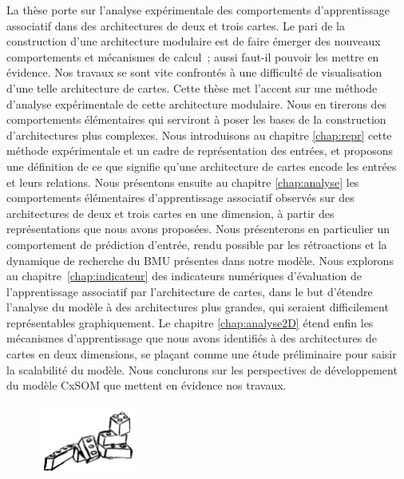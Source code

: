La thèse porte sur l'analyse expérimentale des comportements d'apprentissage associatif dans des architectures de deux et trois cartes. Le pari de la construction d'une architecture modulaire est de faire émerger des nouveaux comportements et mécanismes de calcul~; aussi faut-il pouvoir les mettre en évidence. Nos travaux se sont vite confrontés à une difficulté de visualisation d'une telle architecture de cartes. Cette thèse met l'accent sur une méthode d'analyse expérimentale de cette architecture modulaire. Nous en tirerons des comportements élémentaires qui serviront à poser les bases de la construction d'architectures plus complexes.
Nous introduisons au chapitre \ref{chap:repr} cette méthode expérimentale et un cadre de représentation des entrées, et proposons une définition de ce que signifie qu'une architecture de cartes encode les entrées et leurs relations.
Nous présentons ensuite au chapitre \ref{chap:analyse} les comportements élémentaires d'apprentissage associatif observés sur des architectures de deux et trois cartes en une dimension, à partir des représentations que nous avons proposées. Nous présenterons en particulier un comportement de prédiction d'entrée, rendu possible par les rétroactions et la dynamique de recherche du BMU présentes dans notre modèle.
Nous explorons au chapitre~\ref{chap:indicateur} des indicateurs numériques d'évaluation de l'apprentissage associatif par l'architecture de cartes, dans le but d'étendre l'analyse du modèle à des architectures plus grandes, qui seraient difficilement représentables graphiquement.
Le chapitre \ref{chap:analyse2D} étend enfin les mécanismes d'apprentissage que nous avons identifiés à des architectures de cartes en deux dimensions, se plaçant comme une étude préliminaire pour saisir la scalabilité du modèle.
Nous conclurons sur les perspectives de développement du modèle CxSOM que mettent en évidence nos travaux.

    \begin{figure}[b]
        \vspace{1cm}
        \centering\includegraphics[width=0.3\textwidth]{lego2.jpg}
        \vspace{1cm}
    \end{figure}

